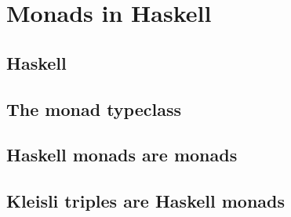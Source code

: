 \documentclass[a4paper]{article}
\theoremstyle{plain}
\theoremstyle{definition}
\begin{document}
\section{Monads in Haskell}
\subsection{Haskell}
\subsection{The monad typeclass}
\subsection{Haskell monads are monads}
\subsection{Kleisli triples are Haskell monads}
\end{document}
